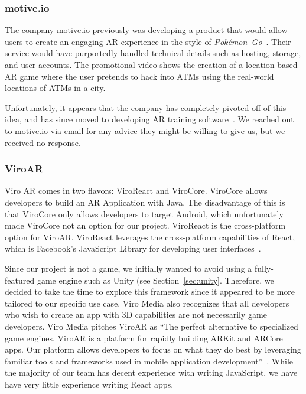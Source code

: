 \documentclass[a4paper, 10pt, american, titlepage]{article}
\begin{document}
\subsubsection{motive.io}
\label{sec:motive.io}

The company motive.io previously was developing a product that would allow
users to create an engaging AR experience in the style of
\textit{Pokémon~Go}~\autocite{odom2017}. Their service would have purportedly
handled technical details such as hosting, storage, and user accounts. The
promotional video shows the creation of a location-based AR game where the user
pretends to hack into ATMs using the real-world locations of ATMs in a city.

Unfortunately, it appears that the company has completely pivoted off of this
idea, and has since moved to developing AR training
software~\autocite{motiveio}. We reached out to motive.io via email for any
advice they might be willing to give us, but we received no response.

\subsubsection{ViroAR}
\label{sec:viroAR}

Viro AR comes in two flavors: ViroReact and ViroCore\autocite{facebook2019}.
ViroCore allows developers to build an AR Application with Java. The
disadvantage of this is that ViroCore only allows developers to target Android,
which unfortunately made ViroCore not an option for our project. ViroReact is
the cross-platform option for ViroAR. ViroReact leverages the cross-platform
capabilities of React, which is Facebook's JavaScript Library for developing
user interfaces~\autocite{facebook2019}.

Since our project is not a game, we initially wanted to avoid using a
fully-featured game engine such as Unity (see Section~\ref{sec:unity}.
Therefore, we decided to take the time to explore this framework since it
appeared to be more tailored to our specific use case. Viro Media also
recognizes that all developers who wish to create an app with 3D capabilities
are not necessarily game developers. Viro Media pitches ViroAR as ``The
perfect alternative to specialized game engines, ViroAR is a platform for
rapidly building ARKit and ARCore apps. Our platform allows developers to focus
on what they do best by leveraging familiar tools and frameworks used in mobile
application development''~\autocite{viro2019}. While the majority of our team
has decent experience with writing JavaScript, we have have very little experience
writing React apps.
\end{document}
